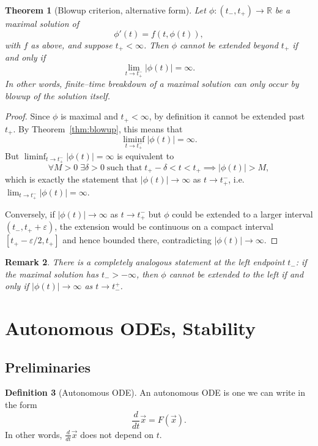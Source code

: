 \documentclass{tufte-handout}
\newcommand*\R{\mathbb{R}}
\newtheorem{thm}{Theorem}[subsection]
\newtheorem{rmk}[thm]{Remark}
\theoremstyle{definition}
\newtheorem{defn}[thm]{Definition}
\begin{document}
\begin{thm}[Blowup criterion, alternative form]\label{thm:blowup-alt}
	Let $\phi \colon (t_-,t_+) \to \R$ be a maximal solution of
	\[
		\phi'(t) = f(t,\phi(t)),
	\]
	with $f$ as above, and suppose $t_+ < \infty$.
	Then $\phi$ \emph{cannot} be extended beyond $t_+$ if and only if
	\[
		\lim_{t \to t_+^{-}} |\phi(t)| = \infty.
	\]
	In other words, finite–time breakdown of a maximal solution can only occur
	by blowup of the solution itself.
\end{thm}

\begin{proof}
	Since $\phi$ is maximal and $t_+ < \infty$, by definition it cannot be extended
	past $t_+$. By Theorem~\ref{thm:blowup}, this means that
	\[
		\liminf_{t \to t_+^{-}} |\phi(t)| = \infty.
	\]
	But $\liminf_{t\to t_+^{-}} |\phi(t)| = \infty$ is equivalent to
	\[
		\forall M > 0 \;\exists \delta > 0 \;\text{such that}\;
		t_+ - \delta < t < t_+ \implies |\phi(t)| > M,
	\]
	which is exactly the statement that $|\phi(t)| \to \infty$ as $t \to t_+^{-}$,
	i.e.\ $\lim_{t\to t_+^{-}} |\phi(t)| = \infty$.

	Conversely, if $|\phi(t)| \to \infty$ as $t \to t_+^{-}$ but $\phi$ could
	be extended to a larger interval $(t_-,t_+ + \varepsilon)$, the extension would
	be continuous on a compact interval $[t_+ - \varepsilon/2,t_+]$ and hence bounded
	there, contradicting $|\phi(t)| \to \infty$.
\end{proof}

\begin{rmk}
	There is a completely analogous statement at the left endpoint $t_-$: if the
	maximal solution has $t_- > -\infty$, then $\phi$ cannot be extended to the left
	if and only if $|\phi(t)| \to \infty$ as $t \to t_-^{+}$.
\end{rmk}

\section{Autonomous ODEs, Stability}
\subsection{Preliminaries}
\begin{defn}[Autonomous ODE]
	An autonomous ODE is one we can write in the form \[
		\frac{d}{dt} \vec x = F(\vec x)
	.\] In other words, $\frac{d}{dt} \vec x$ does not depend on $t$.
\end{defn}
\end{document}

